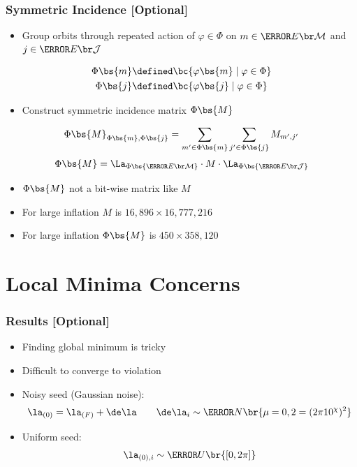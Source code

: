 \documentclass[
    hyperref={bookmarks=false},%
    xcolor={dvipsnames},
]{beamer}
\renewcommand{\term}[1]{\textcolor{Mahogany}{#1}}
\renewcommand{\tcdot}{\cdot} %
\begin{document}
\begin{frame}
    \frametitle{Symmetric Incidence [Optional]}
    \begin{itemize}
        \item Group orbits through repeated action of $\varphi \in \Phi$ on $m \in \Events{\mscenario}$ and $j \in \Events{\jointvar}$
    \end{itemize}
    \begin{align*}
        \Phi\bs{m} &\defined \bc{\varphi\bs{m} \mid \varphi \in \Phi} \\
        \Phi\bs{j} &\defined \bc{\varphi\bs{j} \mid \varphi \in \Phi}
    \end{align*}
    \begin{itemize}
        \item Construct \term{symmetric incidence matrix} $\Phi\bs{M}$
    \end{itemize}
    \[ \Phi\bs{M}_{\Phi\bs{m}, \Phi\bs{j}} = \sum_{m' \in \Phi\bs{m}}\sum_{j' \in \Phi\bs{j}} M_{m',j'} \]
    \[ \Phi\bs{M} = \La_{\Phi\bs{\Events{\mscenario}}}\tcdot M \tcdot \La_{\Phi\bs{\Events{\jointvar}}} \]
    \begin{itemize}
        \item $\Phi\bs{M}$ not a bit-wise matrix like $M$
        \item For large inflation $M$ is $16,896 \times 16,777,216$
        \item For large inflation $\Phi\bs{M}$ is $450 \times 358,120$ %
    \end{itemize}
\end{frame}

\section{Local Minima Concerns}

\begin{frame}
    \frametitle{Results [Optional]}
    \begin{itemize}
        \item Finding global minimum is tricky
        \item Difficult to converge to violation
        \item Noisy seed (Gaussian noise):
        \[ \la_{(0)} = \la_{(F)} + \de \la \qquad \de \la_{i} \sim \s{N}\br{\mu = 0, \si^2 = (2\pi10^{\chi})^2} \]
        \item Uniform seed:
        \[ \la_{(0), i} \sim \s{U}\br{[0, 2\pi]} \]
    \end{itemize}
\end{frame}
\end{document}
